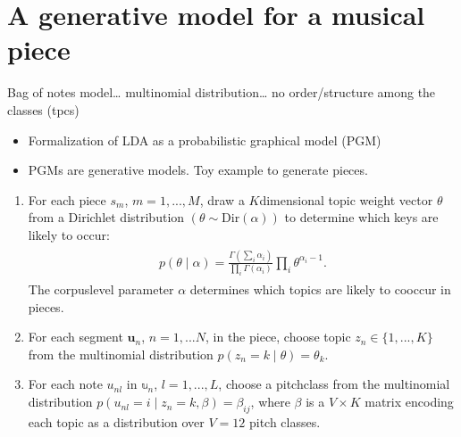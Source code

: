 \documentclass[letterpaper,10pt,english]{sphinxmanual}
\begin{document}
\section{A generative model for a musical piece}
\label{\detokenize{topic_modeling:a-generative-model-for-a-musical-piece}}
\sphinxAtStartPar
Bag of notes model… multinomial distribution… no order/structure
among the classes (tpcs)
\begin{itemize}
\item {} 
\sphinxAtStartPar
Formalization of LDA as a probabilistic graphical model (PGM)

\item {} 
\sphinxAtStartPar
PGMs are generative models. Toy example to generate pieces.

\end{itemize}
\begin{enumerate}
%
\item {} 
\sphinxAtStartPar
For each piece \(s_m\), \(m=1, ..., M\), draw a
\(K\)\sphinxhyphen{}dimensional topic weight vector \(\theta\) from a
Dirichlet distribution
\(\left(\theta \sim \mathrm{Dir}(\alpha)\right)\) to determine
which keys are likely to occur:
\begin{equation*}
\begin{split}\begin{aligned}
    p(\theta \mid \alpha) = \frac{\Gamma\left(\sum_i \alpha_i\right)}{\prod_i \Gamma \left(\alpha_i\right)}\prod_i \theta^{\alpha_i - 1}.
    \end{aligned}\end{split}
\end{equation*}
\sphinxAtStartPar
The corpus\sphinxhyphen{}level parameter \(\alpha\) determines which topics are
likely to co\sphinxhyphen{}occur in pieces.

\item {} 
\sphinxAtStartPar
For each segment \(\mathbf u_n\), \(n=1, ...N\), in the
piece, choose topic \(z_n \in \{1, ..., K\}\) from the
multinomial distribution \(p(z_n=k \mid \theta) = \theta_k\).

\item {} 
\sphinxAtStartPar
For each note \(u_{nl}\) in \(\mathbb u_n\),
\(l=1, ..., L\), choose a pitch\sphinxhyphen{}class from the multinomial
distribution \(p(u_{nl} = i \mid z_n=k, \beta)=\beta_{ij}\),
where \(\beta\) is a \(V \times K\) matrix encoding each
topic as a distribution over \(V=12\) pitch classes.

\end{enumerate}
\end{document}
